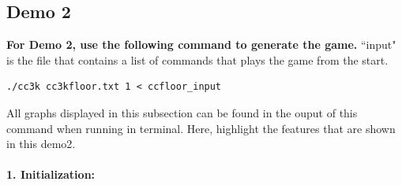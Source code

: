 \documentclass[11pt]{article}
\theoremstyle{plain}
\begin{document}
\newpage

\subsection{Demo 2}
\textbf{For Demo 2, use the following command to generate the game.} ``input"
is the file that contains a list of commands that plays the game from the
start.
\begin{lstlisting}
./cc3k cc3kfloor.txt 1 < ccfloor_input
\end{lstlisting}
All graphs displayed in this subsection can be found in the ouput of
this command when running in terminal. Here, highlight the features that
are shown in this demo2.\\\\

\textbf{1. Initialization:}
\end{document}
